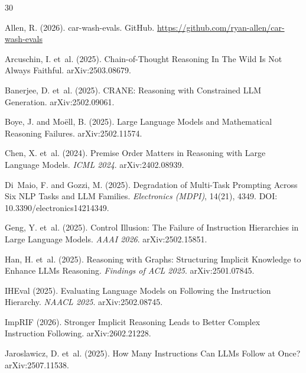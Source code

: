 \documentclass[11pt]{article}
\begin{document}

\begin{thebibliography}{30}

Allen, R. (2026).
\newblock car-wash-evals.
\newblock GitHub. \url{https://github.com/ryan-allen/car-wash-evals}

Arcuschin, I. et~al. (2025).
\newblock Chain-of-Thought Reasoning In The Wild Is Not Always Faithful.
\newblock arXiv:2503.08679.

Banerjee, D. et~al. (2025).
\newblock CRANE: Reasoning with Constrained LLM Generation.
\newblock arXiv:2502.09061.

Boye, J. and Mo{\"e}ll, B. (2025).
\newblock Large Language Models and Mathematical Reasoning Failures.
\newblock arXiv:2502.11574.

Chen, X. et~al. (2024).
\newblock Premise Order Matters in Reasoning with Large Language Models.
\newblock \textit{ICML 2024}. arXiv:2402.08939.

Di~Maio, F. and Gozzi, M. (2025).
\newblock Degradation of Multi-Task Prompting Across Six NLP Tasks and LLM Families.
\newblock \textit{Electronics (MDPI)}, 14(21), 4349. DOI: 10.3390/electronics14214349.

Geng, Y. et~al. (2025).
\newblock Control Illusion: The Failure of Instruction Hierarchies in Large Language Models.
\newblock \textit{AAAI 2026}. arXiv:2502.15851.

Han, H. et~al. (2025).
\newblock Reasoning with Graphs: Structuring Implicit Knowledge to Enhance LLMs Reasoning.
\newblock \textit{Findings of ACL 2025}. arXiv:2501.07845.

IHEval (2025).
\newblock Evaluating Language Models on Following the Instruction Hierarchy.
\newblock \textit{NAACL 2025}. arXiv:2502.08745.

ImpRIF (2026).
\newblock Stronger Implicit Reasoning Leads to Better Complex Instruction Following.
\newblock arXiv:2602.21228.

Jaroslawicz, D. et~al. (2025).
\newblock How Many Instructions Can LLMs Follow at Once?
\newblock arXiv:2507.11538.


\end{thebibliography}
\end{document}
